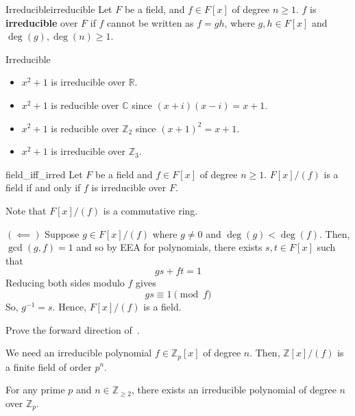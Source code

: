 
\begin{Definition}{Irreducible}{irreducible}
    Let $ F $ be a field, and $ f\in F[x] $ of degree $ n\geqslant 1 $.
    $ f $ is \textbf{irreducible} over $ F $ if $ f $ cannot be written
    as $ f=gh $, where $ g,h\in F[x] $ and $ \deg(g),\deg(n)\geqslant 1 $.
\end{Definition}

\begin{Example}{Irreducible}{}
    \begin{itemize}
        \item $ x^2+1 $ is irreducible over $ \mathbb{R} $.
        \item $ x^2+1 $ is reducible over $ \mathbb{C} $ since $ (x+i)(x-i)=x+1 $.
        \item $ x^2+1 $ is reducible over $ \mathbb{Z}_2 $ since $ (x+1)^2=x+1 $.
        \item $ x^2+1 $ is irreducible over $ \mathbb{Z}_3 $.
    \end{itemize}
\end{Example}

\begin{Theorem}{}{field_iff_irred}
    Let $ F $ be a field and $ f\in F[x] $ of degree $ n\geqslant 1 $.
    $ F[x]/(f) $ is a field if and only if $ f $ is irreducible over $ F $.
\end{Theorem}

\begin{Proof}{}{}
    Note that $ F[x]/(f) $ is a commutative ring.

    $ (\impliedby) $ Suppose $ g\in F[x]/(f) $ where $ g\neq 0 $
    and $ \deg(g)<\deg(f) $. Then, $ \gcd(g,f)=1 $ and so by EEA
    for polynomials, there exists $ s,t\in F[x] $ such that
    \[ gs+ft=1 \]
    Reducing both sides modulo $ f $ gives
    \[ gs\equiv 1 \pmod{f} \]
    So, $ g^{-1}=s $. Hence, $ F[x]/(f) $ is a field.
\end{Proof}

\begin{Exercise}{}{}
    Prove the forward direction of~.
\end{Exercise}

We need an irreducible polynomial $ f\in\mathbb{Z}_p[x] $ of degree $ n $.
Then, $ \mathbb{Z}[x]/(f) $ is a finite field of order $ p^n $.

\begin{Theorem}{}{}
    For any prime $ p $ and $ n\in\mathbb{Z}_{\geqslant 2} $, there exists
    an irreducible polynomial of degree $ n $ over $ \mathbb{Z}_p $.
\end{Theorem}

